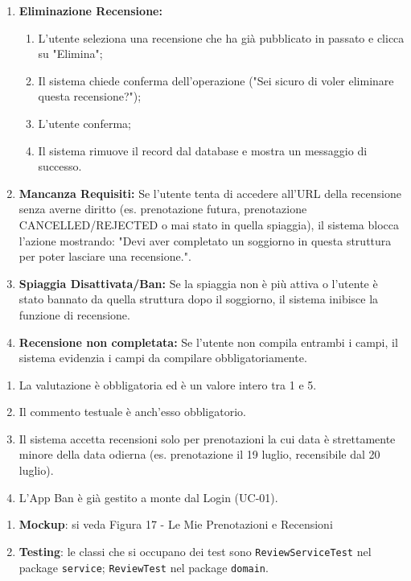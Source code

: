 \documentclass{article}
\begin{document}
	{
		\begin{enumerate}[nosep, leftmargin=25px]
			\item[\textbf{2a.}] \textbf{Eliminazione Recensione:} 
			\begin{enumerate}[nosep, leftmargin=*]
				\item[i.] L'utente seleziona una recensione che ha già pubblicato in passato e clicca su "Elimina";
				\item[ii.] Il sistema chiede conferma dell'operazione ("Sei sicuro di voler eliminare questa recensione?");
				\item[iii.] L'utente conferma;
				\item[iv.] Il sistema rimuove il record dal database e mostra un messaggio di successo.
			\end{enumerate}
			\item[\textbf{3a-e.}] \textbf{Mancanza Requisiti:} Se l'utente tenta di accedere all'URL della recensione senza averne diritto (es. prenotazione futura, prenotazione CANCELLED/REJECTED o mai stato in quella spiaggia), il sistema blocca l'azione mostrando: "Devi aver completato un soggiorno in questa struttura per poter lasciare una recensione.".
			\item[\textbf{3b-e.}] \textbf{Spiaggia Disattivata/Ban:} Se la spiaggia non è più attiva o l'utente è stato bannato da quella struttura dopo il soggiorno, il sistema inibisce la funzione di recensione.
			\item[\textbf{6a-e.}] \textbf{Recensione non completata:} Se l'utente non compila entrambi i campi, il sistema evidenzia i campi da compilare obbligatoriamente.
		\end{enumerate}
	}
	{
		\begin{enumerate}[nosep, leftmargin=*]
			\item[•] La valutazione è obbligatoria ed è un valore intero tra 1 e 5.
			\item[•] Il commento testuale è anch'esso obbligatorio.
			\item[•] Il sistema accetta recensioni solo per prenotazioni la cui data è strettamente minore della data odierna (es. prenotazione il 19 luglio, recensibile dal 20 luglio).
			\item[•] L'App Ban è già gestito a monte dal Login (UC-01).
		\end{enumerate}
		
		\begin{enumerate}[leftmargin=*]
			\item[•] \textbf{Mockup}: si veda Figura 17 - Le Mie Prenotazioni e Recensioni
			
			\item[•] \textbf{Testing}: le classi che si occupano dei test sono \texttt{ReviewServiceTest} nel package \texttt{service}; \texttt{ReviewTest} nel package \texttt{domain}.
		\end{enumerate}
	}
		
\end{document}
